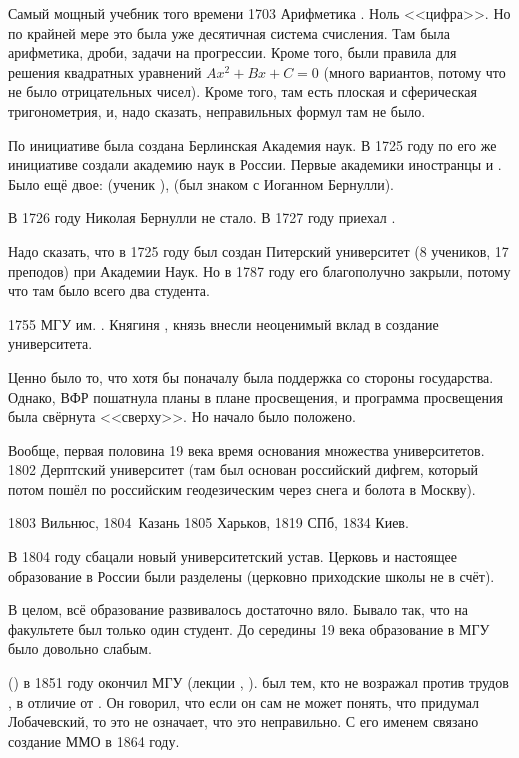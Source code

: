 \documentclass[a4paper,oneside,fleqn,10pt]{article}
\begin{document}
Самый мощный учебник того времени 1703 Арифметика .
Ноль <<цифра>>. Но по крайней мере это была уже десятичная система счисления.
Там была арифметика, дроби, задачи на прогрессии. Кроме того, были правила для
решения квадратных уравнений $Ax^2 + Bx + C=0$ (много вариантов, потому что не было
отрицательных чисел). Кроме того, там есть плоская и сферическая тригонометрия,
и, надо сказать, неправильных формул там не было.

По инициативе  была создана Берлинская Академия наук.
В 1725 году по его же инициативе создали академию наук в России.
Первые академики иностранцы  и .
Было ещё двое:  (ученик ),
 (был знаком с Иоганном Бернулли).

В 1726 году Николая Бернулли не стало. В 1727 году приехал .

Надо сказать, что в 1725 году был создан Питерский университет (8 учеников, 17 преподов)
при Академии Наук. Но в 1787 году его благополучно закрыли, потому что там было всего два студента.

1755 МГУ им. . Княгиня , князь  внесли неоценимый вклад
в создание университета.

Ценно было то, что хотя бы поначалу была поддержка со стороны государства.
Однако, ВФР пошатнула планы  в плане просвещения, и программа просвещения была свёрнута
<<сверху>>. Но начало было положено.

Вообще, первая половина 19 века время основания множества университетов.
1802 Дерптский университет (там  был основан российский дифгем, который потом пошёл
по российским геодезическим через снега и болота в Москву).

1803 Вильнюс, 1804\ Казань 1805 Харьков, 1819 СПб, 1834 Киев.

В 1804 году сбацали новый университетский устав.
Церковь и настоящее образование в России были разделены
(церковно приходские школы не в счёт).

В целом, всё образование развивалось достаточно вяло.
Бывало так, что на факультете был только один студент.
До середины 19 века образование в МГУ было довольно слабым.

 () в 1851 году окончил МГУ (лекции , ).
 был тем, кто не возражал против трудов ,
в отличие от . Он говорил, что если он сам не может понять,
что придумал Лобачевский, то это не означает, что это неправильно.
С его именем связано создание ММО в 1864 году.
\end{document}
